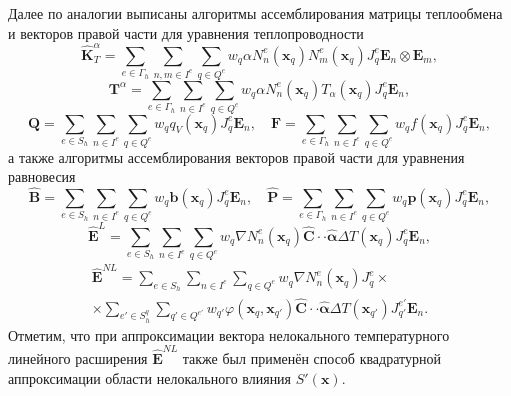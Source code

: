Далее по аналогии выписаны алгоритмы ассемблирования матрицы теплообмена и векторов правой части для уравнения теплопроводности
\[
	\widehat{\textbf{K}}^{\alpha}_T =
	\sum\limits_{e \in \Gamma_h}
	\sum\limits_{n,m \in I^{e}}
	\sum\limits_{q \in Q^e}
	w_q \alpha N_n^e (\boldsymbol{x}_q) N_m^e (\boldsymbol{x}_q) J_q^e \boldsymbol{E}_n \otimes \boldsymbol{E}_m,
\]
\[
	\textbf{T}^{\alpha} =
	\sum\limits_{e \in \Gamma_h}
	\sum\limits_{n \in I^{e}}
	\sum\limits_{q \in Q^e}
	w_q \alpha N_n^e (\boldsymbol{x}_q) T_{\alpha} (\boldsymbol{x}_q) J_q^e \boldsymbol{E}_n,
\]
\[
	\textbf{Q} =
	\sum\limits_{e \in S_h}
	\sum\limits_{n \in I^e}
	\sum\limits_{q \in Q^e}
	w_q q_V (\boldsymbol{x}_q) J_q^e \boldsymbol{E}_n,
	\quad
	\textbf{F} =
	\sum\limits_{e \in \Gamma_h}
	\sum\limits_{n \in I^e}
	\sum\limits_{q \in Q^e}
	w_q f (\boldsymbol{x}_q) J_q^e \boldsymbol{E}_n,
\]
а также алгоритмы ассемблирования векторов правой части для уравнения равновесия
\[
	\widehat{\textbf{B}} =
	\sum\limits_{e \in S_h}
	\sum\limits_{n \in I^e}
	\sum\limits_{q \in Q^e}
	w_q \boldsymbol{b} (\boldsymbol{x}_q) J_q^e \boldsymbol{E}_n,
	\quad
	\widehat{\textbf{P}} = 
	\sum\limits_{e \in \Gamma_h}
	\sum\limits_{n \in I^e}
	\sum\limits_{q \in Q^e}
	w_q \boldsymbol{p} (\boldsymbol{x}_q) J_q^e \boldsymbol{E}_n,
\]
\[
	\widehat{\textbf{E}}^L = 
	\sum\limits_{e \in S_h}
	\sum\limits_{n \in I^e}
	\sum\limits_{q \in Q^e}
	w_q \nabla N_n^e (\boldsymbol{x}_q) \widehat{\mathbf{C}} \cdot \cdot \widehat{\boldsymbol{\alpha}} \Delta T (\boldsymbol{x}_q) J_q^e \boldsymbol{E}_n,
\]
\begin{multline*}
	\widehat{\textbf{E}}^{NL} = 
	\sum\limits_{e \in S_h}
	\sum\limits_{n \in I^e}
	\sum\limits_{q \in Q^e}
	w_q \nabla N_n^e (\boldsymbol{x}_q) J_q^e 
	\times \\ \times
	\sum\limits_{e' \in S_h^q}
	\sum\limits_{q' \in Q^{e'}}
	w_{q'} \varphi (\boldsymbol{x}_q, \boldsymbol{x}_{q'}) \widehat{\mathbf{C}} \cdot \cdot \widehat{\boldsymbol{\alpha}} \Delta T (\boldsymbol{x}_{q'}) J_{q'}^{e'} \boldsymbol{E}_n.
\end{multline*}
Отметим, что при аппроксимации вектора нелокального температурного линейного расширения $\widehat{\textbf{E}}^{NL}$ также был применён способ квадратурной аппроксимации области нелокального влияния $S'(\boldsymbol{x})$.

